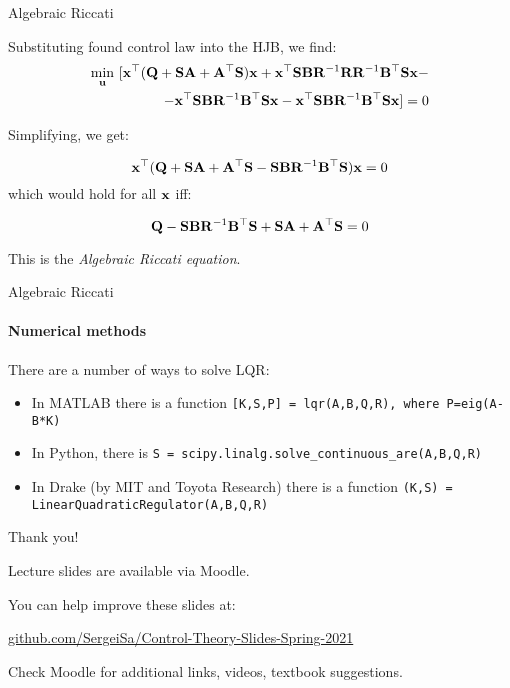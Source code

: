 \documentclass{beamer}
\begin{document}
\begin{frame}{Algebraic Riccati}
\begin{flushleft}

Substituting found control law into the HJB, we find:
\begin{equation}
\begin{split}
\underset{\bo{u}}{\min} \ 
[ 
\bo{x}^\top (
\bo{Q} + \bo{S} \bo{A} + \bo{A}^\top \bo{S}
)\bo{x}
+
\bo{x}^\top \bo{S} \bo{B} \bo{R}^{-1} \bo{R} \mathbf  R^{-1} \bo{B}^\top \bo{S} \bo{x}
- \\
- 
\bo{x}^\top \bo{S} \bo{B} \bo{R}^{-1} \bo{B}^\top \bo{S} \bo{x}
- 
\bo{x}^\top\bo{S} \bo{B} \bo{R}^{-1} \bo{B}^\top \bo{S} \bo{x} 
] = 0
\end{split}
\end{equation}

Simplifying, we get: 

\begin{equation}
\mathbf{x}^\top (\mathbf{Q} + \mathbf{S} \mathbf{A} + \mathbf{A}^\top \mathbf{S}
- \mathbf{S} \mathbf{B} \mathbf{R}^{-1} \mathbf{B}^\top \mathbf{S}) \mathbf{x} = 0
\end{equation}
%
which would hold for all $\mathbf{x}$ iff:
%

\begin{equation}
\mathbf{Q} - \mathbf{S} \mathbf{B} \mathbf{R}^{-1} \mathbf{B}^\top \mathbf{S} 
 + \mathbf{S} \mathbf{A} + \mathbf{A}^\top \mathbf{S} = 0
\end{equation}

This is the \emph{Algebraic Riccati equation}.

\end{flushleft}
\end{frame}

\begin{frame}{Algebraic Riccati}
\framesubtitle{Numerical methods}
\begin{flushleft}

There are a number of ways to solve LQR:

\bigskip

\begin{itemize}
    \item In MATLAB there is a function \texttt{[K,S,P] = lqr(A,B,Q,R), where P=eig(A-B*K)}
    \item In Python, there is \texttt{S = scipy.linalg.solve\_continuous\_are(A,B,Q,R)}
    \item In Drake (by MIT and Toyota Research) there is a function \texttt{(K,S) = LinearQuadraticRegulator(A,B,Q,R)}
\end{itemize}

\end{flushleft}
\end{frame}




\begin{frame}{Thank you!}
\centerline{Lecture slides are available via Moodle.}
\bigskip
\centerline{You can help improve these slides at:}
\centerline{\href{https://github.com/SergeiSa/Control-Theory-Slides-Spring-2021}{github.com/SergeiSa/Control-Theory-Slides-Spring-2021}}
\bigskip
\centerline{Check Moodle for additional links, videos, textbook suggestions.}
\end{frame}
\end{document}
